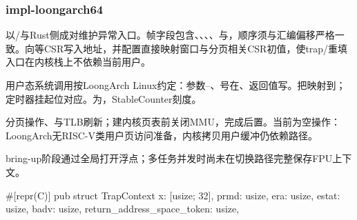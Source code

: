 
\subsubsection{impl-loongarch64}

以/与Rust侧成对维护异常入口。帧字段包含、、、、与，顺序须与汇编偏移严格一致。向等CSR写入地址，并配置直接映射窗口与分页相关CSR初值，使trap/重填入口在内核栈上不依赖当前用户。

用户态系统调用按LoongArch Linux约定：参数--、号在、返回值写。把映射到；定时器挂起位对应。为，StableCounter刻度。

分页操作、与TLB刷新；建内核页表前关闭MMU，完成后置。当前为空操作：LoongArch无RISC-V类用户页访问准备，内核拷贝用户缓冲仍依赖路径。

bring-up阶段通过全局打开浮点；多任务并发时尚未在切换路径完整保存FPU上下文。

\begin{rustcode}
#[repr(C)]
pub struct TrapContext {
    x: [usize; 32],
    prmd: usize,
    era: usize,
    estat: usize,
    badv: usize,
    return_address_space_token: usize,
}
\end{rustcode}
